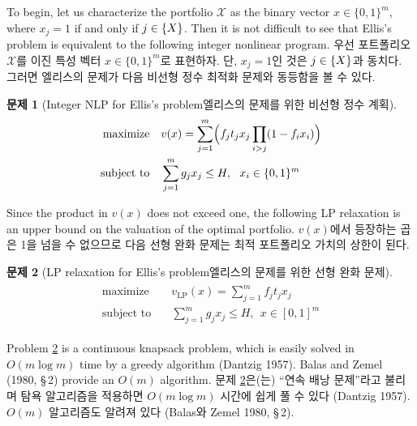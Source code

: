 \documentclass[11pt]{article} %
\theoremstyle{definition}
\newtheorem{problem}{Problem}
\theoremstyle{definition}
\newtheorem{problem}{문제}
\begin{document}
\ifen
To begin, let us characterize the portfolio $\mathcal{X}$ as the binary vector $x \in \{0, 1\}^m$, where $x_j = 1 $ if and only if $j \in \mathcal\{X\}$. Then it is not difficult to see that Ellis's problem is equivalent to the following integer nonlinear program. 
\else
우선 포트폴리오 $\mathcal{X}$를 이진 특성 벡터 $x \in \{0, 1\}^m$로 표현하자. 단, $x_j = 1 $인 것은 $j \in \mathcal\{X\}$과 동치다. 그러면 엘리스의 문제가 다음 비선형 정수 최적화 문제와 동등함을 볼 수 있다.
\fi
\begin{problem}[\ifen Integer NLP for Ellis's problem\else 엘리스의 문제를 위한 비선형 정수 계획\fi] \label{integernlp}
\begin{align}
\begin{split}
\text{maximize}\quad &  v(x) = \sum_{j=1}^m \Bigl(f_j t_j  x_j \prod_{i > j} (1 - f_{i} x_i) \Bigr)\\
\text{subject to}\quad & \sum_{j=1}^m g_j x_j \leq H, ~~ x_i \in \{0, 1\}^m
\end{split}
\end{align}
\end{problem}
\ifen
\noindent Since the product in $v(x)$ does not exceed one, the following LP relaxation is an upper bound on the valuation of the optimal portfolio.
\else
\noindent $v(x)$에서 등장하는 곱은 1을 넘을 수 없으므로 다음 선형 완화 문제는 최적 포트폴리오 가치의 상한이 된다.
\fi
\begin{problem}[\ifen LP relaxation for Ellis's problem\else 엘리스의 문제를 위한 선형 완화 문제\fi] \label{LPrelaxation}
\begin{align}
\begin{split}
\text{maximize}\quad &  v_{\mathrm{LP}}(x) = \sum_{j=1}^m  f_j t_j x_j \\
\text{subject to}\quad & \sum_{j=1}^m g_j x_j \leq H, ~~ x \in [0, 1]^m
\end{split}
\end{align}
\end{problem}
\ifen
\noindent Problem \ref{LPrelaxation} is a continuous knapsack problem, which is easily solved in $O(m \log m)$ time by a greedy algorithm (Dantzig 1957). Balas and Zemel (1980, \S\,2) provide an $O(m)$ algorithm. 
\else
\noindent 문제 \ref{LPrelaxation}은(는) ``연속 배낭 문제''라고 불리며 탐욕 알고리즘을 적용하면 $O(m \log m)$ 시간에 쉽게 풀 수 있다 (Dantzig 1957).  $O(m)$ 알고리즘도 알려져 있다 (Balas와 Zemel 1980, \S\,2).
\fi
\end{document}
